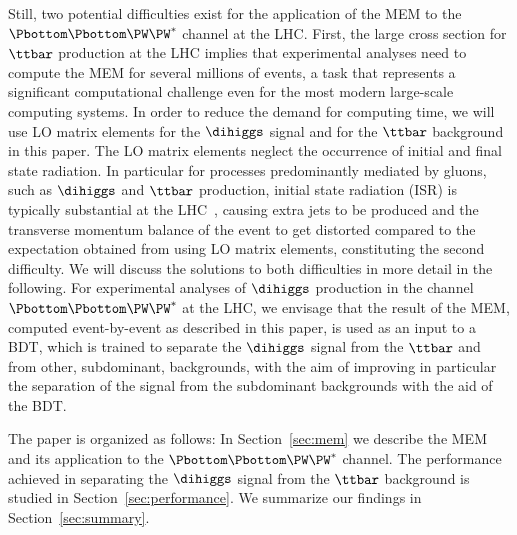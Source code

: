 Still, two potential difficulties exist for the application of the MEM to the $\Pbottom\Pbottom\PW\PW^{*}$ channel at the LHC.
First, the large cross section for $\ttbar$ production at the LHC implies that experimental analyses need to compute the MEM for several millions of events,
a task that represents a significant computational challenge even for the most modern large-scale computing systems.
In order to reduce the demand for computing time,
we will use LO matrix elements for the $\dihiggs$ signal and for the $\ttbar$ background in this paper.
The LO matrix elements neglect the occurrence of initial and final state radiation.
In particular for processes predominantly mediated by gluons, such as $\dihiggs$ and $\ttbar$ production,
initial state radiation (ISR) is typically substantial at the LHC~\cite{Alwall:2010cq},
causing extra jets to be produced and the transverse momentum balance of the event to get distorted compared to the expectation obtained from using LO matrix elements,
constituting the second difficulty.
We will discuss the solutions to both difficulties in more detail in the following.
For experimental analyses of $\dihiggs$ production in the channel $\Pbottom\Pbottom\PW\PW^{*}$ at the LHC,
we envisage that the result of the MEM, computed event-by-event as described in this paper, 
is used as an input to a BDT, which is trained to separate the $\dihiggs$ signal from the $\ttbar$ and from other, subdominant, backgrounds,
with the aim of improving in particular the separation of the signal from the subdominant backgrounds with the aid of the BDT.

The paper is organized as follows:
In Section~\ref{sec:mem} we describe the MEM and its application to the $\Pbottom\Pbottom\PW\PW^{*}$ channel.
The performance achieved in separating the $\dihiggs$ signal from the $\ttbar$ background is studied in Section~\ref{sec:performance}.
We summarize our findings in Section~\ref{sec:summary}.
